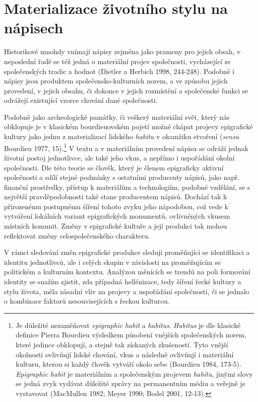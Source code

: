 \section[materializace-životního-stylu-na-nápisech]{Materializace životního stylu na nápisech}

Historikové mnohdy vnímají nápisy zejména jako prameny pro jejich obsah, v neposlední řadě se též jedná o materiální projev společnosti, vycházející ze společenských tradic a hodnot (Dietler a Herbich 1998, 244-248). Podobně i nápisy jsou produktem společensko-kulturních norem, a ve způsobu jejich provedení, v jejich obsahu, či dokonce v jejich rozmístění a společenské funkci se odrážejí existující vzorce chování dané společnosti.

Podobně jako archeologické památky, či veškerý materiální svět, který nás obklopuje je v klasickém bourdieuovském pojetí možné chápat projevy epigrafické kultury jako jednu z materializací lidského {\em habitu} v okamžiku stvoření ({\em sensu} Bourdieu 1977, 15).\footnote{Je důležité nezaměňovat {\em epigraphic habit} a {\em habitus}. {\em Habitus} je dle klasické definice Pierra Bourdieu výsledkem působení vnějších společenských norem, které jedince obklopují, a stejně tak získaných zkušeností. Tyto vnější okolnosti ovlivňují lidské chování, vkus a následně ovlivňují i materiální kulturu, kterou si každý člověk vytváří okolo sebe (Bourdieu 1984, 173-5). {\em Epigraphic habit} je materiálním a společenským projevem {\em habitu}, jinými slovy se jedná zvyk vydávat důležité zprávy na permanentním médiu a veřejně je vystavovat (MacMullen 1982; Meyer 1990; Bodel 2001, 12-13).} V textu a v materiálním provedení nápisu se odráží jednak životní postoj jednotlivce, ale také jeho vkus, a nepřímo i uspořádání okolní společnosti. Dle této teorie se člověk, který je členem epigraficky aktivní společnosti a sdílí stejné podmínky s ostatními producenty nápisů, jako např. finanční prostředky, přístup k materiálům a technologiím, podobné vzdělání, se s největší pravděpodobností také stane producentem nápisů. Dochází tak k přirozenému postupnému šíření tohoto zvyku jeho nápodobou, což vede k vytváření lokálních variant epigrafických monumentů, ovlivněných vkusem místních komunit. Změny v epigrafické kultuře a její produkci tak mohou reflektovat změny celospolečenského charakteru.

V rámci sledování změn epigrafické produkce sleduji proměňující se identifikaci a identitu jednotlivců, ale i celých skupin v závislosti na proměňujícím se politickém a kulturním kontextu. Analýzou měnících se trendů na poli formování identity se snažím zjistit, zda případná hellénizace, tedy šíření řecké kultury a stylu života, měla zásadní vliv na projevy a uspořádání společnosti, či se jednalo o kombinace faktorů nesouvisejících s řeckou kulturou.

